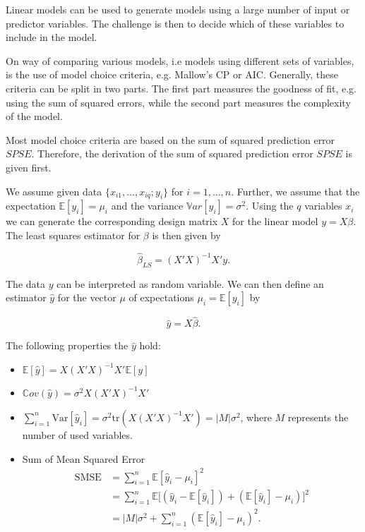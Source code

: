 Linear models can be used to generate models using a large number of input or predictor variables. The challenge is then to decide which of these variables to include in the model. 

On way of comparing various models, i.e models using different sets of variables, is the use of model choice criteria, e.g. Mallow's CP or AIC. Generally, these criteria can be split in two parts. The first part measures the goodness of fit, e.g. using the sum of squared errors, while the second part measures the complexity of the model. 

Most model choice criteria are based on the sum of squared prediction error $SPSE$. Therefore, the derivation of the sum of squared prediction error $SPSE$ is given first.

We assume given data $\{ x_{i1}, \dots, x_{iq}; y_i\}$ for $i =1, \dots, n$. Further, we assume that the expectation $\mathbb{E}[y_i] = \mu_i$ and the variance $\mathbb{V}ar[y_i] = \sigma^2$. Using the $q$ variables $x_i$ we can generate the corresponding design matrix $X$ for the linear model $y = X\beta$. The least squares estimator for $\beta$ is then given by

$$\hat \beta_{LS} = (X'X)^{-1}X'y.$$

The data $y$ can be interpreted as random variable. We can then define an estimator $\hat  y$ for the vector $\mu$ of expectations $\mu_i = \mathbb{E}[y_i]$ by

$$\hat  y = X \hat \beta.$$

The following properties the $\hat y$ hold:

\begin{itemize}
	\item $\mathbb{E} [\hat y] = X(X'X)^{-1}X'\mathbb{E}[y]$
	\item $\mathbb Cov(\hat y) = \sigma^2 X(X'X)^{-1}X'$
	\item $\sum_{i=1}^n \text{Var} [\hat y_i] = \sigma^2 \text{tr}(X(X'X)^{-1}X') = \vert M \vert \sigma^2$, where $M$ represents the number  of used variables.
	\item Sum of Mean Squared Error
		\begin{equation}  
		\begin{split} 
		\text{SMSE} &= \sum_{i=1}^n \mathbb{E}[\hat y_i - \mu_i]^2 \\
				    &= \sum_{i=1}^n \mathbb{E}\big[(\hat y_i - \mathbb{E}[\hat y_i]) + (\mathbb{E}[\hat y_i] - \mu_i) \big]^2 \\
				    &= \vert M \vert\sigma^2 + \sum_{i=1}^n(\mathbb{E}[\hat y_i] - \mu_i)^2.
		\end{split}
		\end{equation}
\end{itemize}

